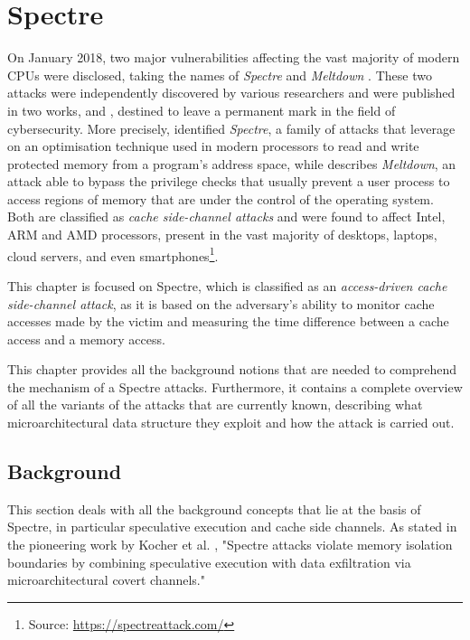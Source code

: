 \documentclass[12pt,a4paper]{book}
\theoremstyle{definition}
\begin{document}
	\chapter{Spectre}\label{chapter:spectre}
	On January 2018, two major vulnerabilities affecting the vast majority of modern CPUs were disclosed, taking the names of \textit{Spectre} \cite{Kocher2019} and \textit{Meltdown} \cite{Lipp2018}. These two attacks were independently discovered by various researchers and were published in 
	two works, \cite{Kocher2019} and \cite{Lipp2018}, destined to leave a permanent mark in the field of cybersecurity. More precisely, \cite{Kocher2019} identified \textit{Spectre}, a family of attacks that leverage on an optimisation technique used in modern processors to read and write protected memory from a program's address space, while \cite{Lipp2018} describes \textit{Meltdown}, an attack able to bypass the privilege checks that usually prevent a user process to access regions of memory that are under the control of the operating system. Both are classified as \textit{cache side-channel attacks} and were found to affect Intel, ARM and AMD processors, present in the vast majority of desktops, laptops, cloud servers, and even smartphones\footnote{Source: \url{https://spectreattack.com/}}.
	
	This chapter is focused on Spectre, which is classified as an \textit{access-driven cache side-channel attack}, as it is based on the adversary's ability to monitor cache accesses made by the victim and measuring the time difference between a cache access and a memory access.
	
	This chapter provides all the background notions that are needed to comprehend the mechanism of a Spectre attacks. Furthermore, it contains a complete overview of all the variants of the attacks that are currently known, describing what microarchitectural data structure they exploit and how the attack is carried out.
	\section{Background}
	This section deals with all the background concepts that lie at the basis of Spectre, in particular speculative execution and cache side channels. As stated in the pioneering work by Kocher et al. \cite{Kocher2019}, "Spectre attacks violate memory isolation boundaries by combining speculative execution with data exfiltration via microarchitectural covert channels."
\end{document}
